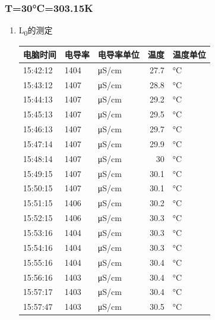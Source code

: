 \documentclass[11pt]{article}
\begin{document}
\subsubsection{T=30°C=303.15K}
\label{sec:orga64e66d}
\begin{enumerate}
\item L\textsubscript{0}的测定
\label{sec:orgd13659a}

\begin{center}
\begin{tabular}{l|lp{3cm}r|l}
电脑时间 & 电导率 & 电导率单位 & 温度 & 温度单位\\
\hline
15:42:12 & 1404 & μS/cm & 27.7 & °C\\
15:43:12 & 1407 & μS/cm & 28.8 & °C\\
15:44:13 & 1407 & μS/cm & 29.2 & °C\\
15:45:13 & 1407 & μS/cm & 29.5 & °C\\
15:46:13 & 1407 & μS/cm & 29.7 & °C\\
15:47:14 & 1407 & μS/cm & 29.9 & °C\\
15:48:14 & 1407 & μS/cm & 30 & °C\\
15:49:15 & 1407 & μS/cm & 30.1 & °C\\
15:50:15 & 1407 & μS/cm & 30.1 & °C\\
15:51:15 & 1406 & μS/cm & 30.2 & °C\\
15:52:15 & 1406 & μS/cm & 30.3 & °C\\
15:53:16 & 1404 & μS/cm & 30.3 & °C\\
15:54:16 & 1404 & μS/cm & 30.3 & °C\\
15:55:16 & 1404 & μS/cm & 30.4 & °C\\
15:56:16 & 1403 & μS/cm & 30.4 & °C\\
15:57:17 & 1403 & μS/cm & 30.4 & °C\\
15:57:47 & 1403 & μS/cm & 30.5 & °C\\
\end{tabular}
\end{center}


\end{enumerate}
\end{document}
